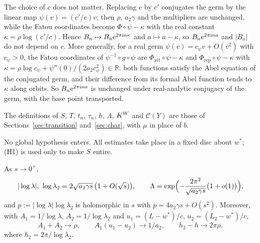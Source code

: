 The choice of $c$ does not matter.  Replacing $c$ by $c'$ conjugates the germ
by the linear map $\psi(v)=(c'/c)v$; then $\rho$, $a_2\gamma$ and the multipliers
are unchanged, while the Fatou coordinates become
$\Phi\circ\psi-\kappa$ with the real constant $\kappa=\rho\log(c'/c)$.  Hence
$B_n\mapsto B_n\mathrm{e}^{2\pi\mathrm{i} n\kappa}$ and $a\mapsto a-\kappa$, so
$B_n\mathrm{e}^{2\pi\mathrm{i} na}$ and $|B_n|$ do not depend on $c$.  More generally, for a real
germ $\psi(v)=c_\psi v+O(v^2)$ with $c_\psi>0$, the Fatou coordinates of
$\psi^{-1}\circ g\circ\psi$ are $\Phi_{\mathrm{att}}\circ\psi-\kappa$ and
$\Phi_{\mathrm{rep}}\circ\psi-\kappa$ with
$\kappa=\rho\log c_\psi+\psi''(0)/(2a_2c_\psi^2)\in\mathbb R$: both functions satisfy the
Abel equation of the conjugated germ, and their difference from its formal Abel
function tends to $\kappa$ along orbits.  So $B_n\mathrm{e}^{2\pi\mathrm{i} na}$ is unchanged
under real-analytic conjugacy of the germ, with the base point transported.

The definitions of
$S$, $T$, $t_n$, $\tau_n$, $h$, $\Lambda$, $K^W$ and $\mathcal C(Y)$ are those of
Sections~\ref{sec:transition} and~\ref{sec:char}, with $\mu$ in place of $b$.

No global hypothesis enters.  All estimates take place in a fixed disc about
$w^*$; (H1) is used only to make $S$ entire.

\begin{proposition}[Scales]\label{prop:gen-scale}
As $s\to0^+$,
\[
 |\log\lambda|,\ \log\lambda_2=2\sqrt{a_2\gamma s}\,\bigl(1+O(\sqrt s)\bigr),\qquad
 \Lambda=\exp\Bigl(-\frac{2\pi^2}{\sqrt{a_2\gamma s}}\bigl(1+o(1)\bigr)\Bigr),
\]
and $p:=|\log\lambda|\log\lambda_2$ is holomorphic in $s$ with
$p=4a_2\gamma s+O(s^2)$.  Moreover, with $A_1=1/\log\lambda$, $A_2=1/\log\lambda_2$
and $u_1=(L-w^*)/c$, $u_2=(L_2-w^*)/c$,
\[
 A_1+A_2\to\rho,\qquad A_1(u_1-u_2)\to1/a_2,\qquad h_2-h\to2\pi\rho,
\]
where $h_2=2\pi/\log\lambda_2$.
\end{proposition}

